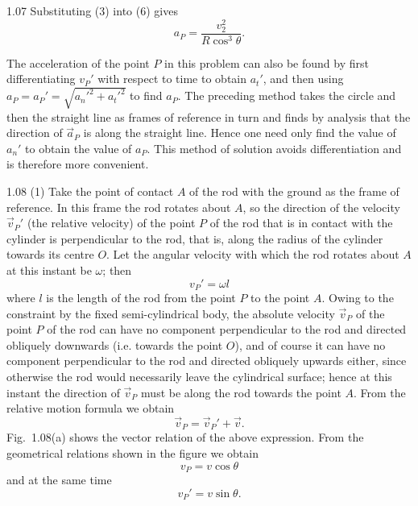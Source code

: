 \begin{solution}{1.07}
Substituting (3) into (6) gives
\[
a_P=\frac{v_2^2}{R\cos^3\theta}.
\]

\begin{commentary}
The acceleration of the point $P$ in this problem can also be found by first differentiating $v_P'$ with respect to time to obtain $a_t'$, and then using $a_P=a_P'=\sqrt{a_n'^2+a_t'^2}$ to find $a_P$. The preceding method takes the circle and then the straight line as frames of reference in turn and finds by analysis that the direction of $\vec{a}_P$ is along the straight line. Hence one need only find the value of $a_n'$ to obtain the value of $a_P$. This method of solution avoids differentiation and is therefore more convenient.
\end{commentary}
\end{solution}

\begin{solution}{1.08}
(1) Take the point of contact $A$ of the rod with the ground as the frame of reference. In this frame the rod rotates about $A$, so the direction of the velocity $\vec{v}_P'$ (the relative velocity) of the point $P$ of the rod that is in contact with the cylinder is perpendicular to the rod, that is, along the radius of the cylinder towards its centre $O$. Let the angular velocity with which the rod rotates about $A$ at this instant be $\omega$; then
\begin{equation}
v_P'=\omega l \tag{1}
\end{equation}
where $l$ is the length of the rod from the point $P$ to the point $A$. Owing to the constraint by the fixed semi-cylindrical body, the absolute velocity $\vec{v}_P$ of the point $P$ of the rod can have no component perpendicular to the rod and directed obliquely downwards (i.e. towards the point $O$), and of course it can have no component perpendicular to the rod and directed obliquely upwards either, since otherwise the rod would necessarily leave the cylindrical surface; hence at this instant the direction of $\vec{v}_P$ must be along the rod towards the point $A$. From the relative motion formula we obtain
\[
\vec{v}_P=\vec{v}_P'+\vec{v}.
\]
Fig.~1.08(a) shows the vector relation of the above expression. From the geometrical relations shown in the figure we obtain
\begin{equation}
v_P=v\cos\theta \tag{2}
\end{equation}
and at the same time
\begin{equation}
v_P'=v\sin\theta. \tag{3}
\end{equation}


\end{solution}
